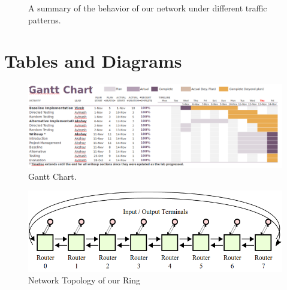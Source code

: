 \documentclass[10pt]{article}
\begin{document}
\begin{figure}[h]
\caption{A summary of the behavior of our network under different traffic
		 patterns.}
\label{fig:patterns}
\end{figure}

\newpage
\section {Tables and Diagrams}


\begin{figure}[h]
	\centering
	\includegraphics[scale=0.4, angle=90]{gantt}
	\caption{Gantt Chart.}
	\label{fig:gantt}
\end{figure}

\begin{figure}[h]
	\centering
	\includegraphics[scale=0.5]{topology}
	\caption{Network Topology of our Ring}
	\label{fig:topo}
\end{figure}
\end{document}
